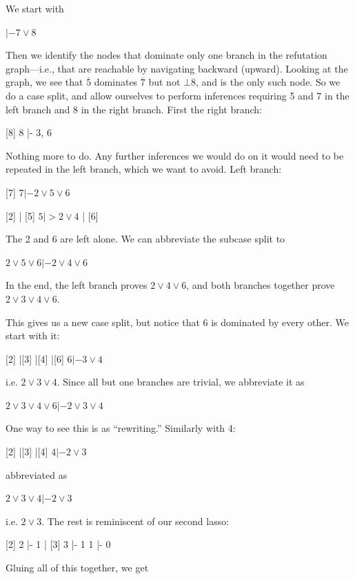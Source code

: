 \documentclass[withtimes,a4paper,12pt]{easychair}
\let\B=\overline
\begin{document}
We start with

$      |- 7 \lor 8$

Then we identify the nodes that dominate only one branch in the refutation
graph---i.e., that are reachable by navigating backward (upward). Looking at the
graph, we see that $\B 5$ dominates $\B 7$ but not $\bot 8$, and is the only
such node. So we do a case split, and allow ourselves to perform inferences
requiring 5 and 7 in the left branch and 8 in the right branch. First the
right branch:

    [8]
    8 |- 3, 6

Nothing more to do. Any further inferences we would do on it
would need to be repeated in the left branch, which we want to avoid.
Left branch:

         [7]
$    7 |- 2 \lor 5 \lor 6$

    { [2]
    | [5]
$      5 |> 2 \lor 4$
    | [6]}

The 2 and 6 are left alone. We can abbreviate the subcase split to

  $2 \lor 5 \lor 6 |- 2 \lor 4 \lor 6$

In the end, the left branch proves $2 \lor 4 \lor 6$, and
both branches together prove $2 \lor 3 \lor 4 \lor 6$.

This gives us a new case split, but notice that 6 is dominated by every other.
We start with it:

  {[2]
  |[3]
  |[4]
  |[6]
$   6 |- 3 \lor 4$}

i.e. $2 \lor 3 \lor 4$. Since all but one branches are trivial, we abbreviate it
as

$  2 \lor 3 \lor 4 \lor 6 |- 2 \lor 3 \lor 4$

One way to see this is as ``rewriting.'' Similarly with 4:

  {[2]
  |[3]
  |[4]
$   4 |- 2 \lor 3$}

abbreviated as

$  2 \lor 3 \lor 4 |- 2 \lor 3$

i.e. $2 \lor 3$. The rest is reminiscent of our second lasso:

  { [2]
    2 |- 1
  | [3]
    3 |- 1 }
  1 |- 0

Gluing all of this together, we get
\end{document}
